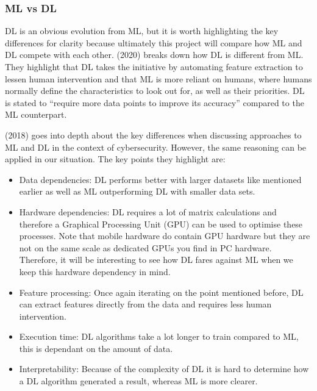 \documentclass{article}
\begin{document}
\subsubsection{ML vs DL}

DL is an obvious evolution from ML, but it is worth highlighting the key differences for clarity because ultimately this 
project will compare how ML and DL compete with each other. \citeauthor{kav2020} (2020) breaks down how DL is different 
from ML. They highlight that DL takes the initiative by automating feature extraction to lessen human intervention and 
that ML is more reliant on humans, where humans normally define the characteristics to look out for, as well as their 
priorities. DL is stated to “require more data points to improve its accuracy” compared to the ML counterpart.

\par

\citeauthor{8359287} (2018) goes into depth about the key differences when discussing approaches to ML and DL in the 
context of cybersecurity. However, the same reasoning can be applied in our situation. The key points they highlight 
are:

\begin{itemize}
    \item Data dependencies: DL performs better with larger datasets like mentioned earlier as well as ML 
    outperforming DL with smaller data sets.
    \item Hardware dependencies: DL requires a lot of matrix calculations and therefore a Graphical Processing 
    Unit (GPU) can be used to optimise these processes. Note that mobile hardware do contain GPU hardware but they are
    not on the same scale as dedicated GPUs you find in PC hardware. Therefore, it will be interesting to see how DL 
    fares against ML when we keep this hardware dependency in mind.
    \item Feature processing: Once again iterating on the point mentioned before, DL can extract features directly 
    from the data and requires less human intervention.
    \item Execution time: DL algorithms take a lot longer to train compared to ML, this is dependant on the amount of 
    data.
    \item Interpretability: Because of the complexity of DL it is hard to determine how a DL algorithm generated a 
    result, whereas ML is more clearer.
\end{itemize}
\end{document}
